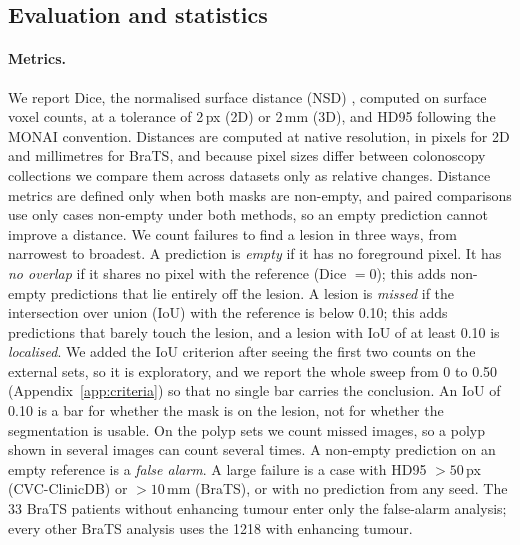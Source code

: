 \subsection{Evaluation and statistics}
\label{sec:eval}
\paragraph{Metrics.} We report Dice, the normalised surface distance (NSD) \cite{nikolov2021nsd}, computed on surface voxel counts, at a tolerance of 2\,px (2D) or 2\,mm (3D), and HD95 following the MONAI convention. Distances are computed at native resolution, in pixels for 2D and millimetres for BraTS, and because pixel sizes differ between colonoscopy collections we compare them across datasets only as relative changes. Distance metrics are defined only when both masks are non-empty, and paired comparisons use only cases non-empty under both methods, so an empty prediction cannot improve a distance. We count failures to find a lesion in three ways, from narrowest to broadest. A prediction is \emph{empty} if it has no foreground pixel. It has \emph{no overlap} if it shares no pixel with the reference (Dice $=0$); this adds non-empty predictions that lie entirely off the lesion. A lesion is \emph{missed} if the intersection over union (IoU) with the reference is below 0.10; this adds predictions that barely touch the lesion, and a lesion with IoU of at least 0.10 is \emph{localised}. We added the IoU criterion after seeing the first two counts on the external sets, so it is exploratory, and we report the whole sweep from 0 to 0.50 (Appendix~\ref{app:criteria}) so that no single bar carries the conclusion. An IoU of 0.10 is a bar for whether the mask is on the lesion, not for whether the segmentation is usable. On the polyp sets we count missed images, so a polyp shown in several images can count several times. A non-empty prediction on an empty reference is a \emph{false alarm}. A large failure is a case with HD95 $>50$\,px (CVC-ClinicDB) or $>10$\,mm (BraTS), or with no prediction from any seed. The 33 BraTS patients without enhancing tumour enter only the false-alarm analysis; every other BraTS analysis uses the 1218 with enhancing tumour.

